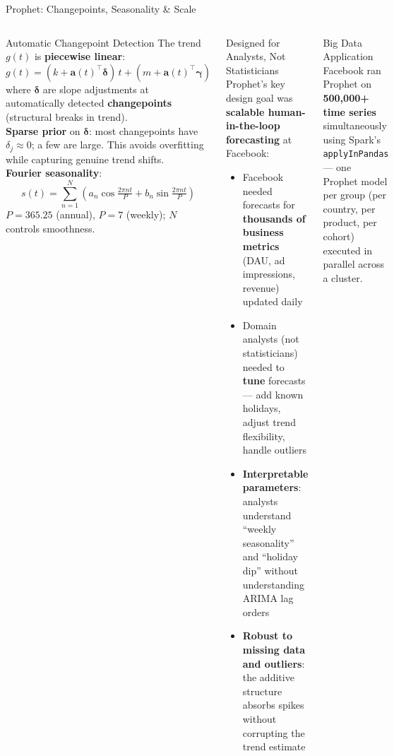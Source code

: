 \documentclass[aspectratio=169,10pt]{beamer}
\begin{document}
\begin{frame}{Prophet: Changepoints, Seasonality \& Scale}
  \begin{columns}[T]
      \begin{block}{Automatic Changepoint Detection}
        The trend $g(t)$ is \textbf{piecewise linear}:
        \[
          g(t) = (k + \mathbf{a}(t)^{\top}\boldsymbol{\delta})\,t
                 + (m + \mathbf{a}(t)^{\top}\boldsymbol{\gamma})
        \]
        where $\boldsymbol{\delta}$ are slope adjustments at
        automatically detected \textbf{changepoints}
        (structural breaks in trend).\\[5pt]
        \textbf{Sparse prior} on $\boldsymbol{\delta}$:
        most changepoints have $\delta_j \approx 0$;
        a few are large.
        This avoids overfitting while capturing genuine trend shifts.\\[5pt]
        \textbf{Fourier seasonality}:
        \[
          s(t) = \sum_{n=1}^{N}
          \left(a_n \cos\!\tfrac{2\pi n t}{P}
              + b_n \sin\!\tfrac{2\pi n t}{P}\right)
        \]
        $P = 365.25$ (annual), $P = 7$ (weekly);
        $N$ controls smoothness.
      \end{block}

      \begin{block}{Designed for Analysts, Not Statisticians}
        Prophet's key design goal was \textbf{scalable human-in-the-loop
        forecasting} at Facebook:
        \begin{itemize}
          \item Facebook needed forecasts for \textbf{thousands of
                business metrics} (DAU, ad impressions, revenue)
                updated daily
          \item Domain analysts (not statisticians) needed to
                \textbf{tune} forecasts — add known holidays,
                adjust trend flexibility, handle outliers
          \item \textbf{Interpretable parameters}: analysts understand
                ``weekly seasonality'' and ``holiday dip'' without
                understanding ARIMA lag orders
          \item \textbf{Robust to missing data and outliers}:
                the additive structure absorbs spikes without
                corrupting the trend estimate
        \end{itemize}
      \end{block}
      \vspace{4pt}
      \begin{alertblock}{Big Data Application}
        Facebook ran Prophet on \textbf{500{,}000+ time series}
        simultaneously using Spark's \texttt{applyInPandas} —
        one Prophet model per group (per country, per product,
        per cohort) executed in parallel across a cluster.
      \end{alertblock}
  \end{columns}
\end{frame}
\end{document}
